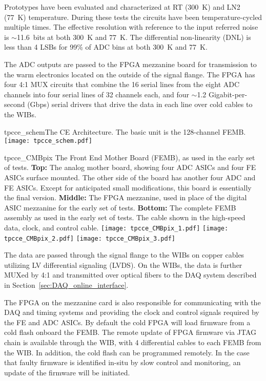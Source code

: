 Prototypes have been evaluated and characterized at RT (300~K) and LN2 (77~K) temperature.
During these tests the circuits have been temperature-cycled multiple times.
The effective resolution with reference to the input referred noise is $\sim$11.6~bits at both 300~K and 77~K.
The differential non-linearity (DNL) is less than 4 LSBs for 99\% of ADC bins at both 300~K and 77~K.

 
 
 The ADC outputs are passed to the FPGA mezzanine board for transmission to the warm electronics
 located on the outside of the signal flange.
The FPGA has four 4:1 MUX circuits that combine the 16 serial lines from the eight ADC
channels into four serial lines of 32 channels each, and 
four $\sim$1.2 Gigabit-per-second (Gbps) serial drivers that drive the data in each
line over cold cables to the WIBs.

\begin{cdrfigure}{tpcce_schem}{The CE Architecture. The basic unit is the 128-channel FEMB.}
\texttt{[image: tpcce\_schem.pdf]}
\end{cdrfigure}

\begin{cdrfigure}{tpcce_CMBpix}
{The Front End Mother Board (FEMB), as used in the early set of tests.
  {\bf Top:} The analog mother board, showing four ADC ASICs and four FE ASICs surface mounted.
  The other side of the board has another four ADC and FE ASICs.
  Except for anticipated small modifications, this board is essentially the final version.
  {\bf Middle:} The FPGA mezzanine, used in place of the digital ASIC mezzanine for the early set of tests.
  {\bf Bottom:} The complete FEMB assembly as used in the early set of tests.
  The cable shown in the high-speed data, clock, and control cable.}
\texttt{[image: tpcce\_CMBpix\_1.pdf]}
\texttt{[image: tpcce\_CMBpix\_2.pdf]}
\texttt{[image: tpcce\_CMBpix\_3.pdf]}
\end{cdrfigure}

The data are passed through the signal flange to the WIBs on copper cables utilizing LV differential signaling (LVDS).
On the WIBs, the data is further MUXed by 4:1 and transmitted over optical
fibers to the DAQ system described in Section~\ref{sec:DAQ_online_interface}.

The FPGA on the mezzanine card is also responsible for communicating with the
DAQ and timing systems and providing the clock and control signals required by the FE and ADC ASICs. 
By default the cold FPGA will load firmware from a cold flash onboard the FEMB. The remote update of 
FPGA firmware via JTAG chain is available through the WIB, with 4 differential cables to each FEMB 
from the WIB. In addition, the cold flash can be programmed remotely. In the case that faulty firmware 
is identified in-situ by slow control and monitoring, an update of the firmware will be initiated.

